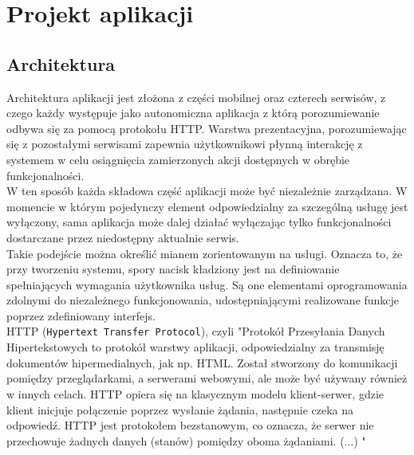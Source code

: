 \chapter{Projekt aplikacji}

\section{Architektura}

Architektura aplikacji jest złożona z części mobilnej oraz czterech serwisów, z czego każdy występuje jako autonomiczna aplikacja z którą porozumiewanie odbywa się za pomocą protokołu HTTP. Warstwa prezentacyjna, porozumiewając się z pozostałymi serwisami zapewnia użytkownikowi płynną interakcję z systemem w celu osiągnięcia zamierzonych akcji dostępnych w obrębie funkcjonalności.\\
W ten sposób każda składowa część aplikacji może być niezależnie zarządzana. W momencie w którym pojedynczy element odpowiedzialny za szczególną usługę jest wyłączony, sama aplikacja może dalej działać wyłączając tylko funkcjonalności dostarczane przez niedostępny aktualnie serwis.\\
\linebreak
Takie podejście można określić mianem zorientowanym na usługi. Oznacza to, że przy tworzeniu systemu, spory nacisk kładziony jest na definiowanie spełniających wymagania użytkownika usług. Są one elementami oprogramowania zdolnymi do niezależnego funkcjonowania, udostępniającymi realizowane funkcje poprzez zdefiniowany interfejs.\\
\linebreak
HTTP (\texttt{Hypertext Transfer Protocol}), czyli "Protokół Przesyłania Danych Hipertekstowych to protokół warstwy aplikacji, odpowiedzialny za transmisję dokumentów hipermedialnych, jak np. HTML. Został stworzony do komunikacji pomiędzy przeglądarkami, a serwerami webowymi, ale może być używany również w innych celach. HTTP opiera się na klasycznym modelu klient-serwer, gdzie klient inicjuje połączenie poprzez wysłanie żądania, następnie czeka na odpowiedź. HTTP jest protokołem bezstanowym, co oznacza, że serwer nie przechowuje żadnych danych (stanów) pomiędzy oboma żądaniami. (...) "~\cite{http}
\linebreak


